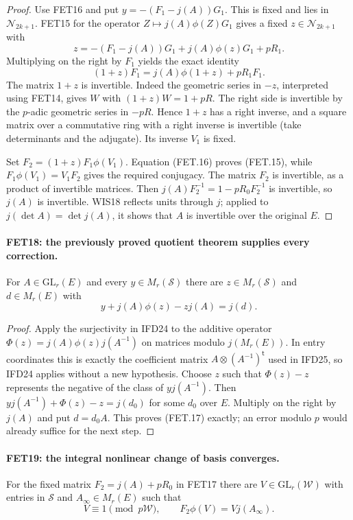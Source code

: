 \documentclass[11pt,a4paper]{article}
\numberwithin{equation}{section}
\theoremstyle{remark}\newtheorem{remark}[theorem]{Remark}
\begin{document}
\begin{proof}
Use FET16 and put $y=-(F_1-j(A))G_1$.
This is fixed and lies in $\mathcal N_{2k+1}$.
FET15 for the operator $Z\mapsto j(A)\phi(Z)G_1$ gives a
fixed $z\in\mathcal N_{2k+1}$ with
\[
 z=-(F_1-j(A))G_1+j(A)\phi(z)G_1+pR_1.
\]
Multiplying on the right by $F_1$ yields the exact identity
\[
 (1+z)F_1=j(A)\phi(1+z)+pR_1F_1.                           \tag{FET.16}
\]
The matrix $1+z$ is invertible. Indeed the geometric series
in $-z$, interpreted using FET14, gives $W$ with
$(1+z)W=1+pR$. The right side is invertible by the $p$-adic
geometric series in $-pR$. Hence $1+z$ has a right inverse,
and a square matrix over a commutative ring with a right inverse
is invertible (take determinants and the adjugate). Its inverse
$V_1$ is fixed.

Set $F_2=(1+z)F_1\phi(V_1)$. Equation (FET.16) proves
(FET.15), while
$F_1\phi(V_1)=V_1F_2$ gives the required conjugacy.
The matrix $F_2$ is invertible, as a product of invertible
matrices. Then
$j(A)F_2^{-1}=1-pR_0F_2^{-1}$ is invertible, so $j(A)$ is
invertible. WIS18 reflects units through $j$; applied to
$j(\det A)=\det j(A)$, it shows that $A$ is invertible over
the original $E$.
\end{proof}

\paragraph{FET18: the previously proved quotient theorem supplies every correction.}
\label{claim:FET18}
For $A\in\mathrm{GL}_r(E)$ and every $y\in M_r(\mathcal S)$
there are $z\in M_r(\mathcal S)$ and $d\in M_r(E)$ with
\[
                        y+j(A)\phi(z)-zj(A)=j(d).          \tag{FET.17}
\]

\begin{proof}
Apply the surjectivity in IFD24 to the additive operator
$\Phi(z)=j(A)\phi(z)j(A^{-1})$ on matrices modulo $j(M_r(E))$.
In entry coordinates this is exactly the coefficient matrix
$A\otimes(A^{-1})^{\mathsf t}$ used in IFD25, so IFD24
applies without a new hypothesis. Choose $z$ such that
$\Phi(z)-z$ represents the negative of the class of
$yj(A^{-1})$. Then
$yj(A^{-1})+\Phi(z)-z=j(d_0)$ for some $d_0$ over $E$.
Multiply on the right by $j(A)$ and put $d=d_0A$.
This proves (FET.17) exactly; an error modulo $p$ would already
suffice for the next step.
\end{proof}

\paragraph{FET19: the integral nonlinear change of basis converges.}
\label{claim:FET19}
For the fixed matrix $F_2=j(A)+pR_0$ in FET17 there are
$V\in\mathrm{GL}_r(\mathcal W)$ with entries in $\mathcal S$
and $A_\infty\in M_r(E)$ such that
\[
 V\equiv1\pmod {p\mathcal W},\qquad
                   F_2\phi(V)=Vj(A_\infty).               \tag{FET.18}
\]
\end{document}
